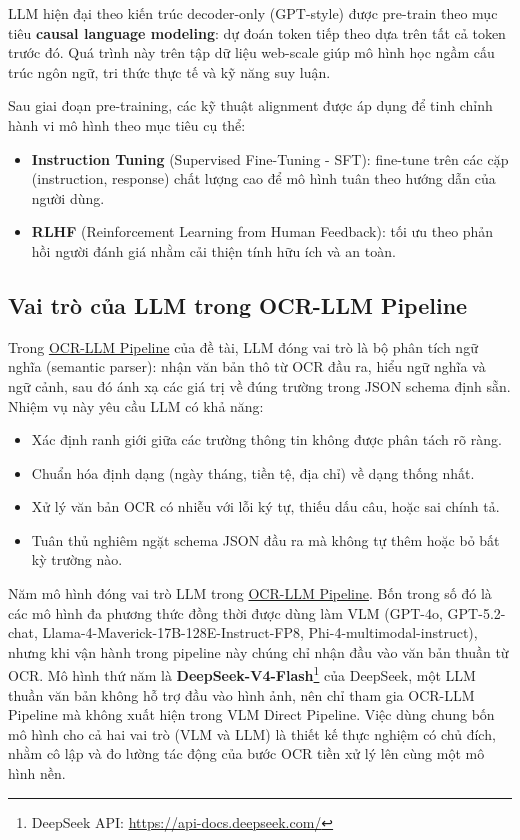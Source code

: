 ﻿\documentclass[12pt]{report}
\begin{document}
LLM hiện đại theo kiến trúc decoder-only (GPT-style) \cite{openai2023gpt4} được pre-train theo mục tiêu \textbf{causal language modeling}: dự đoán token tiếp theo dựa trên tất cả token trước đó. Quá trình này trên tập dữ liệu web-scale giúp mô hình học ngầm cấu trúc ngôn ngữ, tri thức thực tế và kỹ năng suy luận.

Sau giai đoạn pre-training, các kỹ thuật alignment được áp dụng để tinh chỉnh hành vi mô hình theo mục tiêu cụ thể:

\begin{itemize}
    \item \textbf{Instruction Tuning} (Supervised Fine-Tuning - SFT): fine-tune trên các cặp (instruction, response) chất lượng cao để mô hình tuân theo hướng dẫn của người dùng.
    \item \textbf{RLHF} (Reinforcement Learning from Human Feedback): tối ưu theo phản hồi người đánh giá nhằm cải thiện tính hữu ích và an toàn.
\end{itemize}

\subsection{Vai trò của LLM trong OCR-LLM Pipeline}\label{sec:llm_role}

Trong \hyperref[sec:ocr_llm_pipeline]{OCR-LLM Pipeline} của đề tài, LLM đóng vai trò là bộ phân tích ngữ nghĩa (semantic parser): nhận văn bản thô từ OCR đầu ra, hiểu ngữ nghĩa và ngữ cảnh, sau đó ánh xạ các giá trị về đúng trường trong JSON schema định sẵn. Nhiệm vụ này yêu cầu LLM có khả năng:

\begin{itemize}
    \item Xác định ranh giới giữa các trường thông tin không được phân tách rõ ràng.
    \item Chuẩn hóa định dạng (ngày tháng, tiền tệ, địa chỉ) về dạng thống nhất.
    \item Xử lý văn bản OCR có nhiễu với lỗi ký tự, thiếu dấu câu, hoặc sai chính tả.
    \item Tuân thủ nghiêm ngặt schema JSON đầu ra mà không tự thêm hoặc bỏ bất kỳ trường nào.
\end{itemize}

Năm mô hình đóng vai trò LLM trong \hyperref[sec:ocr_llm_pipeline]{OCR-LLM Pipeline}. Bốn trong số đó là các mô hình đa phương thức đồng thời được dùng làm VLM (GPT-4o, GPT-5.2-chat, Llama-4-Maverick-17B-128E-Instruct-FP8, Phi-4-multimodal-instruct), nhưng khi vận hành trong pipeline này chúng chỉ nhận đầu vào văn bản thuần từ OCR. Mô hình thứ năm là \textbf{DeepSeek-V4-Flash}\footnote{DeepSeek API: \url{https://api-docs.deepseek.com/}} của DeepSeek, một LLM thuần văn bản không hỗ trợ đầu vào hình ảnh, nên chỉ tham gia OCR-LLM Pipeline mà không xuất hiện trong VLM Direct Pipeline. Việc dùng chung bốn mô hình cho cả hai vai trò (VLM và LLM) là thiết kế thực nghiệm có chủ đích, nhằm cô lập và đo lường tác động của bước OCR tiền xử lý lên cùng một mô hình nền.
\end{document}
